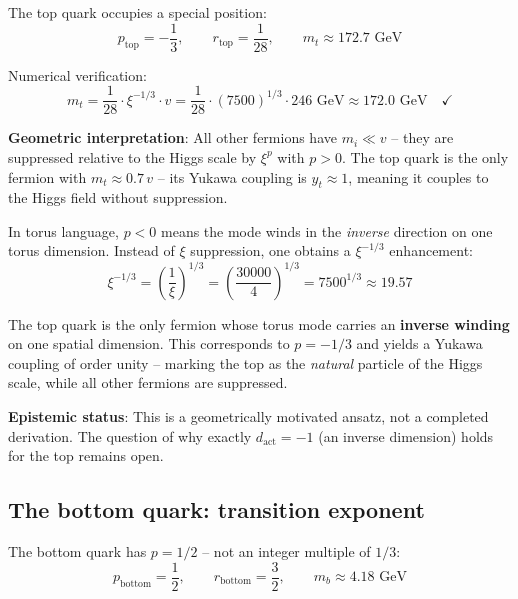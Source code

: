 The top quark occupies a special position:
\begin{equation}
    p_{\text{top}} = -\frac{1}{3}, \qquad
    r_{\text{top}} = \frac{1}{28}, \qquad
    m_t \approx 172.7 \text{ GeV}
\end{equation}

Numerical verification:
\begin{equation}
    m_t = \frac{1}{28} \cdot \xi^{-1/3} \cdot v
    = \frac{1}{28} \cdot (7500)^{1/3} \cdot 246 \text{ GeV}
    \approx 172.0 \text{ GeV} \quad \checkmark
\end{equation}

\textbf{Geometric interpretation}: All other fermions have $m_i \ll v$
-- they are suppressed relative to the Higgs scale by $\xi^p$ with
$p > 0$. The top quark is the only fermion with $m_t \approx 0.7\,v$
-- its Yukawa coupling is $y_t \approx 1$, meaning it couples to the
Higgs field without suppression.

In torus language, $p < 0$ means the mode winds in the \emph{inverse}
direction on one torus dimension. Instead of $\xi$ suppression, one
obtains a $\xi^{-1/3}$ enhancement:
\begin{equation}
    \xi^{-1/3} = \left(\frac{1}{\xi}\right)^{1/3}
    = \left(\frac{30000}{4}\right)^{1/3}
    = 7500^{1/3} \approx 19.57
\end{equation}

\begin{predbox}
The top quark is the only fermion whose torus mode carries an
\textbf{inverse winding} on one spatial dimension. This corresponds
to $p = -1/3$ and yields a Yukawa coupling of order unity -- marking
the top as the \emph{natural} particle of the Higgs scale, while all
other fermions are suppressed.
\end{predbox}

\textbf{Epistemic status}: This is a geometrically motivated ansatz,
not a completed derivation. The question of why exactly
$d_{\text{act}} = -1$ (an inverse dimension) holds for the top
remains open.

\subsection{The bottom quark: transition exponent}

The bottom quark has $p = 1/2$ -- not an integer multiple of $1/3$:
\begin{equation}
    p_{\text{bottom}} = \frac{1}{2}, \qquad
    r_{\text{bottom}} = \frac{3}{2}, \qquad
    m_b \approx 4.18 \text{ GeV}
\end{equation}

